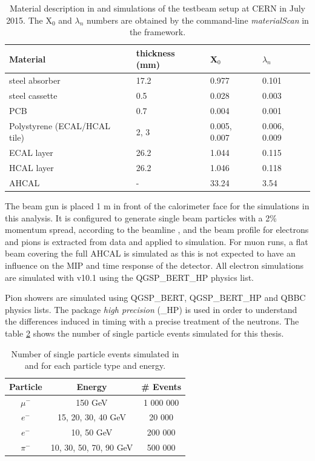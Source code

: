 \begin{table}[htb!]
  \centering
  \caption{Material description in \mokka and \ddhep simulations of the testbeam setup at CERN in July 2015. The X$_0$ and $\lambda_n$ numbers are obtained by the command-line \textit{materialScan} in the \ddhep framework.}
  \label{table:material_sim}
  \begin{tabular}{@{} p{6cm}|l||l|l @{}}
    \hline
    Material & thickness (mm) & X$_0$ & $\lambda_n$ \\
    \hline
    \hline
    steel absorber & 17.2 & 0.977 & 0.101\\
    \hline
    steel cassette & 0.5 & 0.028 & 0.003\\
    \hline
    PCB & 0.7 & 0.004 & 0.001\\
    \hline
    Polystyrene (ECAL/HCAL tile) & 2, 3 & 0.005, 0.007 & 0.006, 0.009\\
    \hline
    \hline
    ECAL layer & 26.2 & 1.044 & 0.115\\
    HCAL layer & 26.2 & 1.046 & 0.118\\
    \hline
    AHCAL & - & 33.24 & 3.54\\
    \hline
  \end{tabular}
\end{table}

The beam gun is placed 1 m in front of the calorimeter face for the simulations in this analysis. It is configured to generate single beam particles with a 2\% momentum spread, according to the beamline \cite{H2Beamline}, and the beam profile for electrons and pions is extracted from data and applied to simulation. For muon runs, a flat beam covering the full AHCAL is simulated as this is not expected to have an influence on the MIP and time response of the detector. All electron simulations are simulated with \geant v10.1 using the QGSP\_BERT\_HP physics list.

Pion showers are simulated using QGSP\_BERT, QGSP\_BERT\_HP and QBBC physics lists. The package \textit{high precision} (\_HP) is used in order to understand the differences induced in timing with a precise treatment of the neutrons. The table \ref{table:event_sim} shows the number of single particle events simulated for this thesis.

\begin{table}[htb!]
  \centering
  \caption{Number of single particle events simulated in \mokka and \ddhep for each particle type and energy.}
  \label{table:event_sim}
  \begin{tabular}{@{} ccc @{}}
    \hline
    Particle & Energy & \# Events \\
    \hline
    $\mu^-$ & 150 GeV & 1 000 000 \\
    \hline
    $e^-$ & 15, 20, 30, 40 GeV & 20 000 \\
    $e^-$ & 10, 50 GeV & 200 000 \\
    \hline
    $\pi^-$ & 10, 30, 50, 70, 90 GeV & 500 000 \\
    \hline
  \end{tabular}
\end{table}

